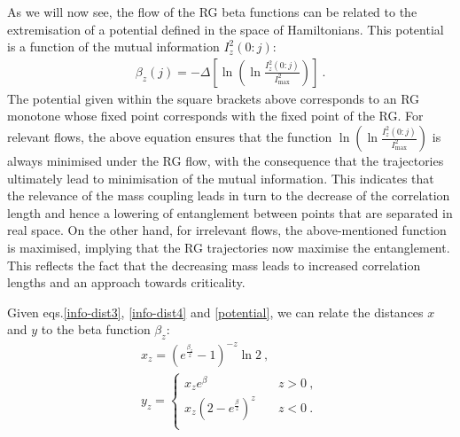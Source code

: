As we will now see, the flow of the RG beta functions can be related to the extremisation of a potential defined in the space of Hamiltonians. This potential is a function of the mutual information \(I^2_z(0:j)\):
\begin{equation}\label{potential}\begin{aligned}
	\beta_z(j) = -\Delta \left[\ln \left(\ln \frac{I^2_z(0:j)}{I^2_\text{max}}\right)\right]~.
\end{aligned}\end{equation}
The potential given within the square brackets above corresponds to an RG monotone whose fixed point corresponds with the fixed point of the RG. For relevant flows, the above equation ensures that the function \(\ln \left(\ln \frac{I^2_z(0:j)}{I^2_\text{max}}\right)\) is always minimised under the RG flow, with the consequence that the trajectories ultimately lead to minimisation of the mutual information. This indicates that the relevance of the mass coupling leads in turn to the decrease of the correlation length and hence a lowering of entanglement between points that are separated in real space.
On the other hand, for irrelevant flows, the above-mentioned function is maximised, implying that the RG trajectories now maximise the entanglement. This reflects the fact that the decreasing mass leads to increased correlation lengths and an approach towards criticality.

Given eqs.\eqref{info-dist3}, \eqref{info-dist4} and \eqref{potential}, we can relate the distances $x$ and $y$ to the beta function $\beta_z$:
\begin{gather}
	\label{x-beta}
	x_z = \left( e^\frac{\beta_z}{z} - 1 \right)^{-z} \ln 2~,\\
	\label{y-beta}
	y_z = \begin{cases}
		x_z e^\beta\quad &z > 0~,\\
		x_z \left(2 - e^\frac{\beta}{z}\right)^z\quad &z < 0~.\\
	\end{cases}
\end{gather}

